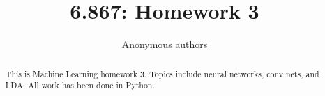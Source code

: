 \documentclass[letterpaper, 10 pt, conference]{ieeeconf}
\title{\LARGE \bf 6.867: Homework 3}
\author{Anonymous authors}
\begin{document}
\maketitle
\thispagestyle{empty} \pagestyle{empty}


\begin{abstract}
This is Machine Learning homework 3. Topics include neural networks, conv nets, and LDA. All work has been done in Python.
\end{abstract}













\balance
%  
% 
\end{document}
